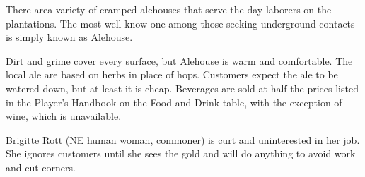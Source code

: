 There area variety of cramped alehouses that serve the day laborers on the plantations.
The most well know one among those seeking underground contacts is simply known as Alehouse.

Dirt and grime cover every surface, but Alehouse is warm and comfortable.
The local ale are based on herbs in place of hops.
Customers expect the ale to be watered down, but at least it is cheap.
Beverages are sold at half the prices listed in the Player's Handbook on the Food and Drink table, with the exception of wine, which is unavailable.

Brigitte Rott (NE human woman, commoner) is curt and uninterested in her job.
She ignores customers until she sees the gold and will do anything to avoid work and cut corners.
